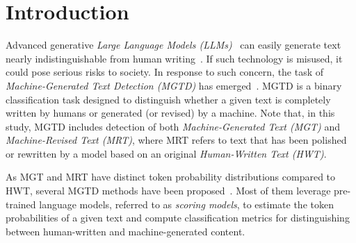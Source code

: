 \section{Introduction}
Advanced generative \textit{Large Language Models (LLMs)}~\cite{gpt4, gpt4o, deepseekr1, deepseekv3, gpto1} can easily generate text nearly indistinguishable from human writing~\cite{indistinguish_1, indistinguish_2}.
%
If such technology is misused, it could pose serious risks to society.
%
%
In response to such concern, the task of \textit{Machine-Generated Text Detection (MGTD)} has emerged~\cite{logrank, entropy, likelihood}.
%
MGTD is a binary classification task designed to distinguish whether a given text is completely written by humans or generated (or revised) by a machine.
%
Note that, in this study, MGTD includes detection of both \textit{Machine-Generated Text (MGT)} and \textit{Machine-Revised Text (MRT)}, where MRT refers to text that has been polished or rewritten by a model based on an original \textit{Human-Written Text (HWT)}.


As MGT and MRT have distinct token probability distributions compared to HWT, several MGTD methods have been proposed~\cite{logrank, likelihood, entropy, detectgpt, fastdetectgpt}. 
%
Most of them leverage pre-trained language models, referred to as \textit{scoring models}, to estimate the token probabilities of a given text and compute classification metrics for distinguishing between human-written and machine-generated content.



